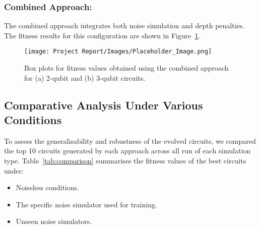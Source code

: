 \documentclass[11pt,a4paper]{article}
\begin{document}
\subsubsection*{Combined Approach:}
The combined approach integrates both noise simulation and depth penalties. The fitness results for this configuration are shown in Figure~\ref{fig:combined_fitness}.

\begin{figure}[H]
    \centering
    \texttt{[image: Project Report/Images/Placeholder\_Image.png]}
    \caption{Box plots for fitness values obtained using the combined approach for (a) 2-qubit and (b) 3-qubit circuits.}
    \label{fig:combined_fitness}
\end{figure}

\subsection{Comparative Analysis Under Various Conditions}
To assess the generalisability and robustness of the evolved circuits, we compared the top 10 circuits generated by each approach across all run of each simulation type. Table~\ref{tab:comparison} summarises the fitness values of the best circuits under:
\begin{itemize}
    \item Noiseless conditions.
    \item The specific noise simulator used for training.
    \item Unseen noise simulators.
\end{itemize}
\end{document}
